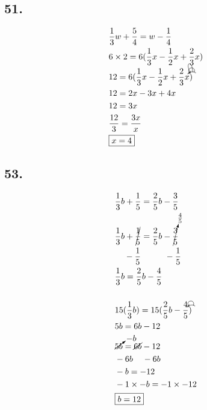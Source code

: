 \documentclass{article}
\newcommand{\tikzmark}[1]{\tikz[overlay,remember picture] \node (#1) {};}
\newcommand{\DrawBox}[2]{%
    \begin{tikzpicture}[overlay,remember picture]
        \draw[->,shorten >=5pt,shorten <=5pt,out=70,in=130,distance=0.5cm,#1] (MarkA.north) to (MarkC.north);
        \draw[->,shorten >=5pt,shorten <=5pt,out=50,in=140,distance=0.3cm,#2] (MarkA.north) to (MarkB.north);
    \end{tikzpicture}
}
\newcommand{\DrawBoxThree}[3]{%
    \begin{tikzpicture}[overlay,remember picture]
        \draw[->,shorten >=5pt,shorten <=5pt,out=70,in=130,distance=0.5cm,#1] (MarkA.north) to (MarkC.north);
        \draw[->,shorten >=5pt,shorten <=5pt,out=50,in=140,distance=0.3cm,#2] (MarkA.north) to (MarkB.north);
        \draw[->,shorten >=5pt,shorten <=5pt,out=90,in=120,distance=0.7cm,#3] (MarkA.north) to (MarkD.north);
    \end{tikzpicture}
}
\begin{document}
    \subsection*{51.}
    \begin{align*}
        & \frac{1}{3}w + \frac{5}{4} = w - \frac{1}{4} \\
        & 6 \times 2 = 6(\frac{1}{3}x - \frac{1}{2}x + \frac{2}{3}x) \\
        & 12 = 6\tikzmark{MarkA}(\frac{1}{3}x\tikzmark{MarkB} - \frac{1}{2}x\tikzmark{MarkC} + \frac{2}{3}x\tikzmark{MarkD})\DrawBoxThree{black}{black}{black} \\
        & 12 = 2x - 3x + 4x  \\
        & 12 = 3x \\
        & \frac{12}{3} = \frac{3x}{x} \\
        & \boxed{x = 4}
    \end{align*}


    \subsection*{53.}
    \begin{align*}
        & \frac{1}{3}b + \frac{1}{5} = \frac{2}{5}b - \frac{3}{5} \\
        & \frac{1}{3}b + \cancel{\frac{1}{5}} = \frac{2}{5}b - \cancelto{\frac{4}{5}}{\frac{3}{5}} \\
        & \hspace{.4cm} - \frac{1}{5} \hspace{1cm} - \frac{1}{5} \\
        & \frac{1}{3}b = \frac{2}{5}b - \frac{4}{5} \\
        & \\
        & 15(\frac{1}{3}b) = \tikzmark{MarkA}15(\frac{2}{5}\tikzmark{MarkB}b - \frac{4}{5}\tikzmark{MarkC})\DrawBox{black}{black} \\
        & 5b = 6b - 12 \\
        & \cancelto{-b}{5b} = \cancel{6b} - 12  \\
        & - 6b \hspace{.4cm} -6b\\
        & -b = -12 \\
        & -1 \times -b = -1 \times -12 \\
        & \boxed{b = 12}
    \end{align*}
\end{document}

